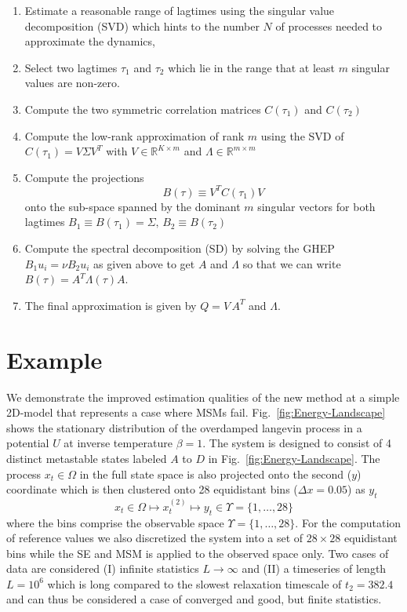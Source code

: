 \documentclass[aps,pre,twocolumn,nofootinbib,superscriptaddress,linenumbers]{revtex4-1}
\begin{document}
\begin{enumerate}
\item Estimate a reasonable range of lagtimes using the singular value decomposition
(SVD) which hints to the number $N$ of processes needed to approximate
the dynamics,
\item Select two lagtimes $\tau_{1}$ and $\tau_{2}$ which lie in the range
that at least $m$ singular values are non-zero.
\item Compute the two symmetric correlation matrices $C(\tau_{1})$ and
$C(\tau_{2})$
\item Compute the low-rank approximation of rank $m$ using the SVD of $C(\tau_{1})=V\Sigma V^{T}$
with $V\in\mathbb{R}^{K\times m}$ and $\Lambda\in\mathbb{R}^{m\times m}$ 
\item Compute the projections 
\[
B(\tau)\equiv V^{T}C(\tau_{1})V
\]
onto the sub-space spanned by the dominant $m$ singular vectors for
both lagtimes $B_{1}\equiv B(\tau_{1})=\Sigma,\, B_{2}\equiv B(\tau_{2})$
\item Compute the spectral decomposition (SD) by solving the GHEP $B_{1}u_{i}=\nu B_{2}u_{i}$
as given above to get $A$ and $\Lambda$ so that we can write $B(\tau)=A^{T}\Lambda(\tau)A$.
\item The final approximation is given by $Q=V\, A^{T}$ and $\Lambda$.
\end{enumerate}



\section{Example}
\label{section:example}

We demonstrate the improved estimation qualities of the new method
at a simple 2D-model that represents a case where MSMs fail. Fig.~\ref{fig:Energy-Landscape}
shows the stationary distribution of the overdamped langevin process
in a potential $U$ at inverse temperature $\beta=1$. The system
is designed to consist of 4 distinct metastable states labeled $A$
to $D$ in Fig.~\ref{fig:Energy-Landscape}. The process $x_{t}\in\Omega$
in the full state space is also projected onto the second ($y$) coordinate
which is then clustered onto 28 equidistant bins ($\Delta x=0.05$)
as $y_{t}$ 
\[
x_{t}\in\Omega\mapsto x_{t}^{(2)}\mapsto y_{t}\in\Upsilon=\{1,\ldots,28\}
\]
where the bins comprise the observable space $\Upsilon=\{1,\ldots,28\}$.
For the computation of reference values we also discretized the system
into a set of $28\times28$ equidistant bins while the SE and MSM
is applied to the observed space only. Two cases of data are considered
(I) infinite statistics $L\rightarrow\infty$ and (II) a timeseries
of length $L=10^{6}$ which is long compared to the slowest relaxation
timescale of $t_{2}=382.4$ and can thus be considered a case of converged
and good, but finite statistics.
\end{document}
